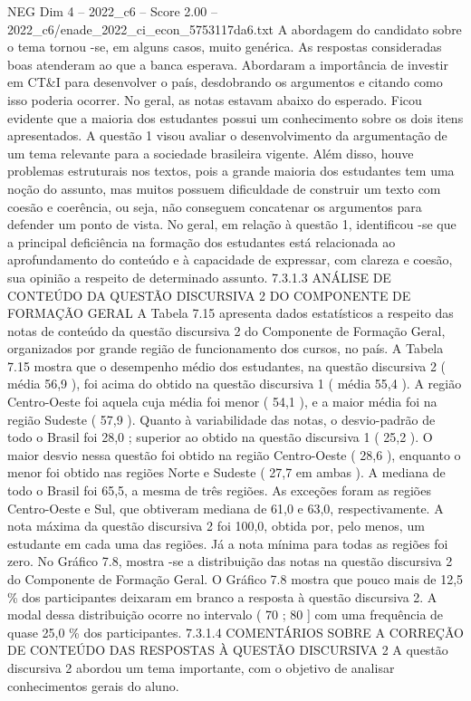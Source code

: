 \begin{textsample}{NEG Dim 4 – 2022\_c6 – Score 2.00 – 2022\_c6/enade\_2022\_ci\_econ\_5753117da6.txt}
A abordagem do candidato sobre o tema tornou -se, em alguns casos, muito genérica.
As respostas consideradas boas atenderam ao que a banca esperava.
Abordaram a importância de investir em CT\&I para desenvolver o país, desdobrando os argumentos e citando como isso poderia ocorrer.
No geral, as notas estavam abaixo do esperado.
Ficou evidente que a maioria dos estudantes possui um conhecimento sobre os dois itens apresentados.
A questão 1 visou avaliar o desenvolvimento da argumentação de um tema relevante para a sociedade brasileira vigente.
Além disso, houve problemas estruturais nos textos, pois a grande maioria dos estudantes tem uma noção do assunto, mas muitos possuem dificuldade de construir um texto com coesão e coerência, ou seja, não conseguem concatenar os argumentos para defender um ponto de vista.
No geral, em relação à questão 1, identificou -se que a principal deficiência na formação dos estudantes está relacionada ao aprofundamento do conteúdo e à capacidade de expressar, com clareza e coesão, sua opinião a respeito de determinado assunto. 7.3.1.3 ANÁLISE DE CONTEÚDO DA QUESTÃO DISCURSIVA 2 DO COMPONENTE DE FORMAÇÃO GERAL A Tabela 7.15 apresenta dados estatísticos a respeito das notas de conteúdo da questão discursiva 2 do Componente de Formação Geral, organizados por grande região de funcionamento dos cursos, no país.
A Tabela 7.15 mostra que o desempenho médio dos estudantes, na questão discursiva 2 ( média 56,9 ), foi acima do obtido na questão discursiva 1 ( média 55,4 ).
A região Centro-Oeste foi aquela cuja média foi menor ( 54,1 ), e a maior média foi na região Sudeste ( 57,9 ).
Quanto à variabilidade das notas, o desvio-padrão de todo o Brasil foi 28,0 ; superior ao obtido na questão discursiva 1 ( 25,2 ).
O maior desvio nessa questão foi obtido na região Centro-Oeste ( 28,6 ), enquanto o menor foi obtido nas regiões Norte e Sudeste ( 27,7 em ambas ).
A mediana de todo o Brasil foi 65,5, a mesma de três regiões.
As exceções foram as regiões Centro-Oeste e Sul, que obtiveram mediana de 61,0 e 63,0, respectivamente.
A nota máxima da questão discursiva 2 foi 100,0, obtida por, pelo menos, um estudante em cada uma das regiões.
Já a nota mínima para todas as regiões foi zero.
No Gráfico 7.8, mostra -se a distribuição das notas na questão discursiva 2 do Componente de Formação Geral.
O Gráfico 7.8 mostra que pouco mais de 12,5 \% dos participantes deixaram em branco a resposta à questão discursiva 2.
A modal dessa distribuição ocorre no intervalo ( 70 ; 80 ] com uma frequência de quase 25,0 \% dos participantes. 7.3.1.4 COMENTÁRIOS SOBRE A CORREÇÃO DE CONTEÚDO DAS RESPOSTAS À QUESTÃO DISCURSIVA 2 A questão discursiva 2 abordou um tema importante, com o objetivo de analisar conhecimentos gerais do aluno.

\end{textsample}
